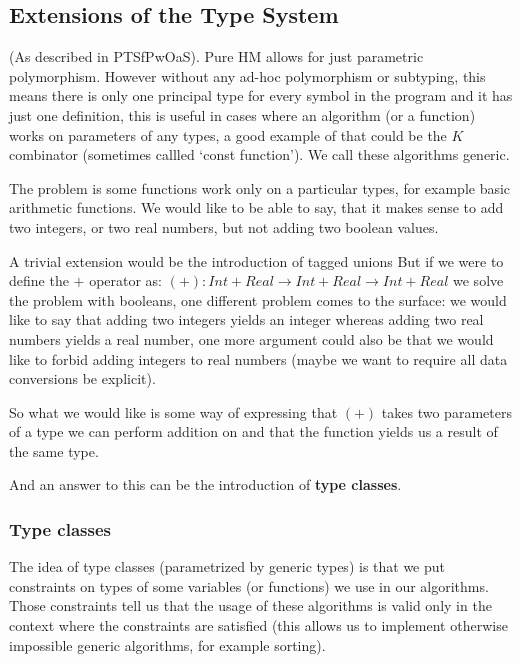 \subsection{Extensions of the Type System}

(As described in PTSfPwOaS).
Pure HM allows for just parametric polymorphism. However without any ad-hoc polymorphism or subtyping, this means there is only one principal type for every symbol in the program and it has just one definition, this is useful in cases where an algorithm (or a function) works on parameters of any types, a good example of that could be the $K$ combinator (sometimes callled `const function'). We call these algorithms generic.

The problem is some functions work only on a particular types, for example basic arithmetic functions. We would like to be able to say, that it makes sense to add two integers, or two real numbers, but not adding two boolean values.

A trivial extension would be the introduction of tagged unions %
But if we were to define the $+$ operator as: $(+) : Int + Real \rightarrow Int + Real \rightarrow Int + Real$ we solve the problem with booleans, one different problem comes to the surface: we would like to say that adding two integers yields an integer whereas adding two real numbers yields a real number, one more argument could also be that we would like to forbid adding integers to real numbers (maybe we want to require all data conversions be explicit).

So what we would like is some way of expressing that $(+)$ takes two parameters of a type we can perform addition on and that the function yields us a result of the same type.

And an answer to this can be the introduction of \textbf{type classes}.

\subsubsection{Type classes}

The idea of type classes (parametrized by generic types) is that we put constraints on types of some variables (or functions) we use in our algorithms. Those constraints tell us that the usage of these algorithms is valid only in the context where the constraints are satisfied (this allows us to implement otherwise impossible generic algorithms, for example sorting).

